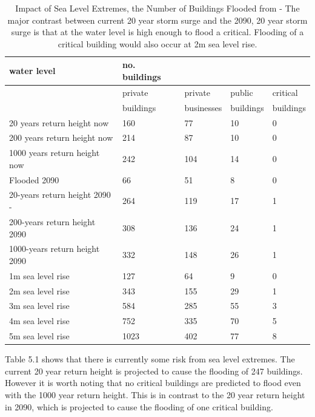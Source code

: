 \begin{table}[h!]
    \centering
    \begin{tabular}{|l|l|l|l|l|}
    \hline
        water level & no. buildings  & ~ & ~ & ~ \\ \hline
        ~ & private & private & public  & critical  \\ \newline
        ~ & buildings & businesses & buildings & buildings \\ \hline        
        20 years return height now & 160 & 77 & 10 & 0 \\ \hline
        200 years return height now & 214 & 87 & 10 & 0 \\ \hline
        1000 years return height now & 242 & 104 & 14 & 0 \\ \hline
        Flooded 2090 & 66 & 51 & 8 & 0 \\ \hline
        20-years return height 2090 -& 264 & 119 & 17 & 1 \\ \hline
        200-years return height  2090 & 308 & 136 & 24 & 1 \\ \hline
        1000-years return height  2090 & 332 & 148 & 26 & 1 \\ \hline
        1m sea level rise & 127 & 64 & 9 & 0 \\ \hline
        2m sea level rise & 343 & 155 & 29 & 1 \\ \hline
        3m sea level rise & 584 & 285 & 55 & 3 \\ \hline
        4m sea level rise & 752 & 335 & 70 & 5 \\ \hline
        5m sea level rise & 1023 & 402 & 77 & 8 \\ \hline
    \end{tabular}
    \caption{Impact of Sea Level Extremes, the Number of Buildings Flooded from \cite{kartverket_se_2021} - The major contrast between current 20 year storm surge and the 2090, 20 year storm surge is that at the water level is high enough to flood a critical. Flooding of a critical building would also occur at 2m sea level rise.}
    \label{building-impact-sle}
\end{table}


Table 5.1 shows that there is currently some risk from sea level extremes. The current 20 year return height is projected to cause the flooding of 247 buildings. However it is worth noting that no critical buildings are predicted to flood even with the 1000 year return height. This is in contrast to the 20 year return height in 2090, which is projected to cause the flooding of one critical building.
